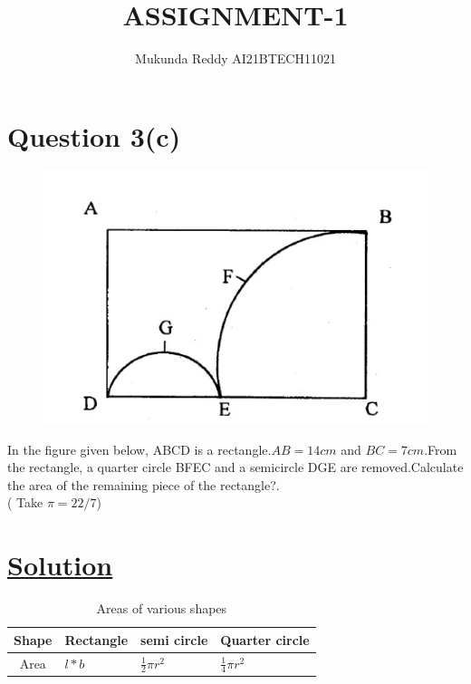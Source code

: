 \documentclass[journal,12pt,twocolumn]{IEEEtran}
\begin{document}
\title{ASSIGNMENT-1}
\author{Mukunda Reddy AI21BTECH11021}
\date{}
\maketitle

\section*{\large Question 3(c)}
\begin{figure}[H]
    \centering
    \includegraphics[scale = 0.5]{Figure_1.jpg}
\end{figure}

In the figure given below, ABCD is a rectangle.${AB = 14cm}$ and
${BC= 7 cm}$.From the rectangle, a quarter circle BFEC and a
semicircle DGE are removed.Calculate the area of the remaining
piece of the rectangle?.\\
( Take $ \pi = 22/7 $)\\
\hline
\section*{\underline{\Large{Solution\:}}}

\begin{table}[H]
    \centering
    \renewcommand{\arraystretch}{1.5}
    \begin{tabular}{|c|p{1.5cm}|p{1.2cm}|p{1.2cm}|}
    \hline
    Shape & Rectangle & semi circle & Quarter circle\\ \hline
    Area &$l*b$ & $\frac{1}{2}\pi r^2$ & $\frac{1}{4}\pi r^2$\\
    \hline
    \end{tabular}
    \caption*{Areas of various shapes}
\end{table}
\end{document}
